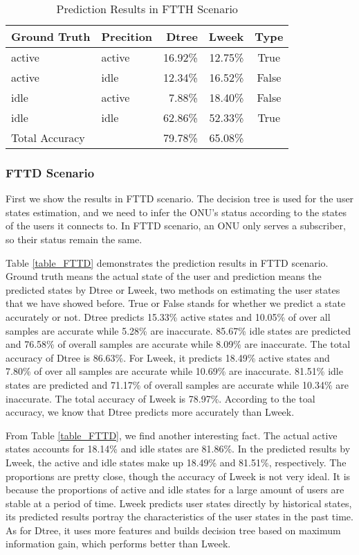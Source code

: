 \documentclass[journal]{IEEEtran}
\begin{document}
\begin{table}[H]
\centering
\caption{Prediction Results in FTTH Scenario}
\label{table_FTTH}
\begin{tabular}{llrrc}
  \toprule
Ground Truth & Precition & Dtree & Lweek & Type\\  
  \midrule
active & active & 16.92\% & 12.75\% & True\\  
active & idle & 12.34\% & 16.52\% & False\\ 
idle & active & 7.88\% & 18.40\% & False\\
idle & idle & 62.86\% & 52.33\% & True\\ 
  \midrule
\qquad \qquad Total Accuracy &  & 79.78\% & 65.08\%\\ 
  \bottomrule
\end{tabular}  
\end{table}

\subsubsection{FTTD Scenario} First we show the results in FTTD scenario. The decision tree is used for the user states estimation, and we need to infer the ONU's status according to the states of the users it connects to. In FTTD scenario, an ONU only serves a subscriber, so their status remain the same.

Table \ref{table_FTTD} demonstrates the prediction results in FTTD scenario. Ground truth means the actual state of the user and prediction means the predicted states by Dtree or Lweek, two methods on estimating the user states that we have showed before. True or False stands for whether we predict a state accurately or not. Dtree predicts 15.33\% active states and 10.05\% of over all samples are accurate while 5.28\% are inaccurate. 85.67\% idle states are predicted and 76.58\% of overall samples are accurate while 8.09\% are inaccurate. The total accuracy of Dtree is 86.63\%. For Lweek, it predicts 18.49\% active states and 7.80\% of over all samples are accurate while 10.69\% are inaccurate. 81.51\% idle states are predicted and 71.17\% of overall samples are accurate while 10.34\% are inaccurate. The total accuracy of Lweek is 78.97\%. According to the toal accuracy, we know that Dtree predicts more accurately than Lweek.

From Table \ref{table_FTTD}, we find another interesting fact. The actual active states accounts for 18.14\% and idle states are 81.86\%. In the predicted results by Lweek, the active and idle states make up 18.49\% and 81.51\%, respectively. The proportions are pretty close, though the accuracy of Lweek is not very ideal. It is because the proportions of active and idle states for a large amount of users are stable at a period of time. Lweek predicts user states directly by historical states, its predicted results portray the characteristics of the user states in the past time. As for Dtree, it uses more features and builds decision tree based on maximum information gain, which performs better than Lweek.
\end{document}
